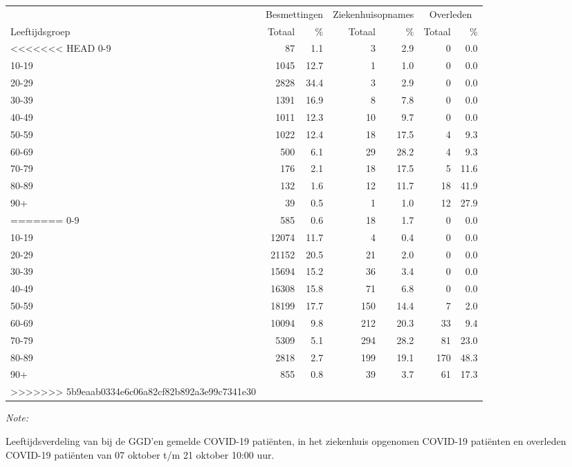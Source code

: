 \documentclass[
  english,
  man,floatsintext]{apa6}
\begin{document}
\begin{table}[H]
\centering\begingroup\fontsize{11}{13}\selectfont

\begin{threeparttable}
\begin{tabular}{lrrrrrr}
\toprule
\multicolumn{1}{c}{ } & \multicolumn{2}{c}{Besmettingen} & \multicolumn{2}{c}{Ziekenhuisopnames} & \multicolumn{2}{c}{Overleden} \\
\cmidrule(l{3pt}r{3pt}){2-3} \cmidrule(l{3pt}r{3pt}){4-5} \cmidrule(l{3pt}r{3pt}){6-7}
Leeftijdsgroep & Totaal & \% & Totaal & \% & Totaal & \%\\
\midrule
<<<<<<< HEAD
0-9 & 87 & 1.1 & 3 & 2.9 & 0 & 0.0\\
10-19 & 1045 & 12.7 & 1 & 1.0 & 0 & 0.0\\
20-29 & 2828 & 34.4 & 3 & 2.9 & 0 & 0.0\\
30-39 & 1391 & 16.9 & 8 & 7.8 & 0 & 0.0\\
40-49 & 1011 & 12.3 & 10 & 9.7 & 0 & 0.0\\
50-59 & 1022 & 12.4 & 18 & 17.5 & 4 & 9.3\\
60-69 & 500 & 6.1 & 29 & 28.2 & 4 & 9.3\\
70-79 & 176 & 2.1 & 18 & 17.5 & 5 & 11.6\\
80-89 & 132 & 1.6 & 12 & 11.7 & 18 & 41.9\\
90+ & 39 & 0.5 & 1 & 1.0 & 12 & 27.9\\
=======
0-9 & 585 & 0.6 & 18 & 1.7 & 0 & 0.0\\
10-19 & 12074 & 11.7 & 4 & 0.4 & 0 & 0.0\\
20-29 & 21152 & 20.5 & 21 & 2.0 & 0 & 0.0\\
30-39 & 15694 & 15.2 & 36 & 3.4 & 0 & 0.0\\
40-49 & 16308 & 15.8 & 71 & 6.8 & 0 & 0.0\\
50-59 & 18199 & 17.7 & 150 & 14.4 & 7 & 2.0\\
60-69 & 10094 & 9.8 & 212 & 20.3 & 33 & 9.4\\
70-79 & 5309 & 5.1 & 294 & 28.2 & 81 & 23.0\\
80-89 & 2818 & 2.7 & 199 & 19.1 & 170 & 48.3\\
90+ & 855 & 0.8 & 39 & 3.7 & 61 & 17.3\\
>>>>>>> 5b9eaab0334e6c06a82cf82b892a3e99c7341e30
\bottomrule
\end{tabular}
\begin{tablenotes}
\item \textit{Note: } 
\item Leeftijdsverdeling van bij de GGD’en gemelde COVID-19 patiënten, in het ziekenhuis opgenomen COVID-19 patiënten en overleden COVID-19 patiënten van 07 oktober t/m 21 oktober 10:00 uur.
\end{tablenotes}
\end{threeparttable}
\endgroup{}
\end{table}
\end{document}
